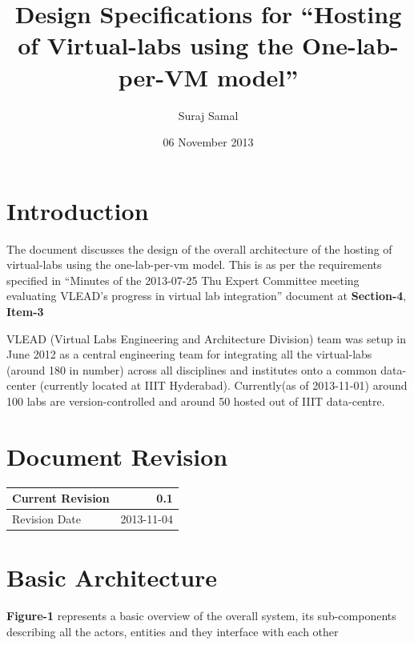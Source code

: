 \documentclass[11pt]{article}
\title{Design Specifications for ``Hosting of Virtual-labs using the One-lab-per-VM model''}
\author{Suraj Samal}
\date{06 November 2013}
\begin{document}
\maketitle

\setcounter{tocdepth}{3}
\tableofcontents
\vspace*{1cm}
\listoffigures

\section{Introduction}
\label{sec-1}


   The document discusses the design of the overall architecture of
   the hosting of virtual-labs using the one-lab-per-vm model. This is
   as per the requirements specified in ``Minutes of the 2013-07-25 Thu
   Expert Committee meeting evaluating VLEAD’s progress in virtual lab
   integration'' document at \textbf{Section-4}, \textbf{Item-3}

   VLEAD (Virtual Labs Engineering and Architecture Division) team was
   setup in June 2012 as a central engineering team for integrating
   all the virtual-labs (around 180 in number) across all disciplines
   and institutes onto a common data-center (currently located at IIIT
   Hyderabad). Currently(as of 2013-11-01) around 100 labs are
   version-controlled and around 50 hosted out of IIIT data-centre.

\section{Document Revision}
\label{sec-2}



\begin{center}
\begin{tabular}{lr}
\hline
 Current Revision  &         0.1  \\
\hline
 Revision Date     &  2013-11-04  \\
\hline
\end{tabular}
\end{center}



\section{Basic Architecture}
\label{sec-3}


   \textbf{Figure-1} represents a basic overview of the overall system, its
   sub-components describing all the actors, entities and they
   interface with each other
\end{document}
